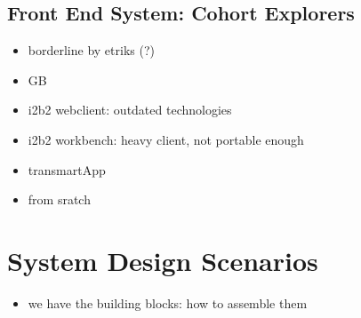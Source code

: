 \subsection{Front End System: Cohort Explorers}
\begin{itemize}
    \item borderline by etriks (?)
    \item GB
    \item i2b2 webclient: outdated technologies
    \item i2b2 workbench: heavy client, not portable enough
    \item transmartApp 
    \item from sratch
\end{itemize}





\section{System Design Scenarios}

\begin{itemize}
    \item we have the building blocks: how to assemble them
\end{itemize}







